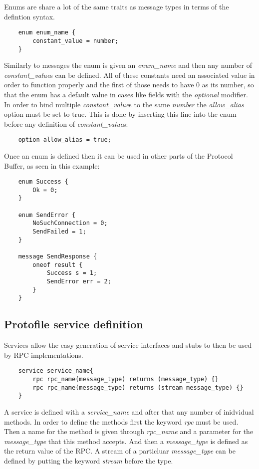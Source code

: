 Enums are share a lot of the same traits as message types in terms of the defintion syntax.

\begin{verbatim}
    enum enum_name {
        constant_value = number;
    }
\end{verbatim}

Similarly to messages the enum is given an \textit{enum\_name} and then any number of \textit{constant\_value}s can be defined. All of these constants need an associated
value in order to function properly and the first of those needs to have 0 as its number, so that the enum has a default value in cases like fields with the \textit{optional}
modifier. 
In order to bind multiple \textit{constant\_value}s to the same \textit{number} the \textit{allow\_alias} option must be set to true. This is done by inserting this line
into the enum before any definition of \textit{constant\_value}s:

\begin{verbatim}
    option allow_alias = true;
\end{verbatim}

Once an enum is defined then it can be used in other parts of the Protocol Buffer, as seen in this example:

\begin{verbatim}
    enum Success {
        Ok = 0;
    }

    enum SendError {
        NoSuchConnection = 0;
        SendFailed = 1;
    }

    message SendResponse {
        oneof result {
            Success s = 1;
            SendError err = 2;
        }
    }
\end{verbatim}

\subsection{Protofile service definition}

Services allow the easy generation of service interfaces and stubs to then be used by RPC implementations.

\begin{verbatim}
    service service_name{
        rpc rpc_name(message_type) returns (message_type) {}
        rpc rpc_name(message_type) returns (stream message_type) {}
    }
\end{verbatim}

A service is defined with a \textit{service\_name} and after that any number of inidvidual methods. In order to define the methods first the keyword \textit{rpc} must be used.
Then a name for the method is given through \textit{rpc\_name} and a parameter for the \textit{message\_type} that this method accepts. And then a \textit{message\_type}
is defined as the return value of the RPC. A stream of a particluar \textit{message\_type} can be defined by putting the keyword \textit{stream} before the type.

